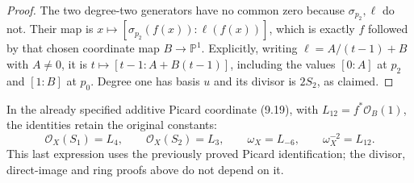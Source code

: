 \begin{proof}
The two degree-two generators have no common zero because
$\sigma_{p_2},\ell$ do not. Their map is
$x\mapsto[\sigma_{p_2}(f(x)):\ell(f(x))]$, which is exactly
$f$ followed by that chosen coordinate map $B\to\mathbb P^1$.
Explicitly, writing $\ell=A/(t-1)+B$ with $A\ne0$, it is
$t\mapsto[t-1:A+B(t-1)]$, including the values $[0:A]$ at $p_2$
and $[1:B]$ at $p_0$.
Degree one has basis $u$ and its divisor is $2S_2$, as claimed.
\end{proof}

In the already specified additive Picard coordinate (9.19), with
$L_{12}=f^*\mathcal O_B(1)$, the identities retain the original constants:
\[
 \mathcal O_X(S_1)=L_4,\qquad
 \mathcal O_X(S_2)=L_3,\qquad
 \omega_X=L_{-6},\qquad \omega_X^{-2}=L_{12}.
\]
This last expression uses the previously proved Picard identification;
the divisor, direct-image and ring proofs above do not depend on it.
